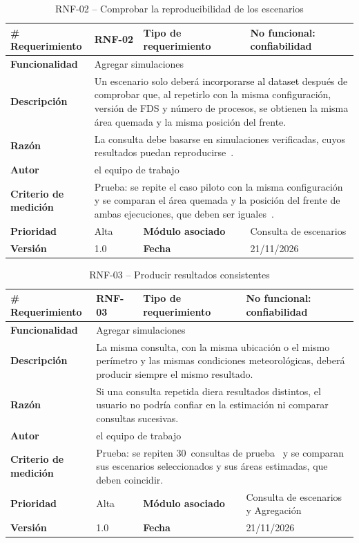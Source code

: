 \begin{longtable}{|p{\rqA}|p{\rqB}|p{\rqC}|p{\rqD}|}
  \caption{RNF-02 -- Comprobar la reproducibilidad de los escenarios}\label{tab:rnf-02}\tabularnewline
  \hline
  \textbf{\# Requerimiento} & RNF-02 & \raggedright\textbf{Tipo de requerimiento} & No funcional: confiabilidad\tabularnewline\hline
  \raggedright\textbf{Funcionalidad} & \multicolumn{3}{p{\rqBCD}|}{Agregar simulaciones}\tabularnewline\hline
  \endfirsthead
  \textbf{Descripción} & \multicolumn{3}{p{\rqBCD}|}{Un escenario solo deberá \textcolor{black}{incorporarse al dataset} después de comprobar que, al repetirlo con la misma configuración, versión de FDS y número de procesos, se obtienen la misma área quemada y la misma posición del frente.}\tabularnewline\hline
  \textbf{Razón} & \multicolumn{3}{p{\rqBCD}|}{La consulta debe basarse en simulaciones verificadas, cuyos resultados puedan reproducirse~\cite{pmp2026}.}\tabularnewline\hline
  \textbf{Autor} & \multicolumn{3}{p{\rqBCD}|}{el equipo de trabajo}\tabularnewline\hline
  \raggedright\textbf{Criterio de medición} & \multicolumn{3}{p{\rqBCD}|}{Prueba: se repite el caso piloto con la misma configuración y se comparan el área quemada y la posición del frente de ambas ejecuciones, que deben ser iguales~\cite{pmp2026}.}\tabularnewline\hline
  \textbf{Prioridad} & Alta & \raggedright\textbf{Módulo asociado} & Consulta de escenarios\tabularnewline\hline
  \textbf{Versión} & 1.0 & \textbf{Fecha} & 21/11/2026\tabularnewline\hline
\end{longtable}

\begin{longtable}{|p{\rqA}|p{\rqB}|p{\rqC}|p{\rqD}|}
  \caption{RNF-03 -- Producir resultados consistentes}\label{tab:rnf-03}\tabularnewline
  \hline
  \textbf{\# Requerimiento} & RNF-03 & \raggedright\textbf{Tipo de requerimiento} & No funcional: confiabilidad\tabularnewline\hline
  \raggedright\textbf{Funcionalidad} & \multicolumn{3}{p{\rqBCD}|}{Agregar simulaciones}\tabularnewline\hline
  \endfirsthead
  \textbf{Descripción} & \multicolumn{3}{p{\rqBCD}|}{La misma consulta, con la misma ubicación o el mismo perímetro y las mismas condiciones meteorológicas, deberá producir siempre el mismo resultado.}\tabularnewline\hline
  \textbf{Razón} & \multicolumn{3}{p{\rqBCD}|}{Si una consulta repetida diera resultados distintos, el usuario no podría confiar en la estimación ni comparar consultas sucesivas.}\tabularnewline\hline
  \textbf{Autor} & \multicolumn{3}{p{\rqBCD}|}{el equipo de trabajo}\tabularnewline\hline
  \raggedright\textbf{Criterio de medición} & \multicolumn{3}{p{\rqBCD}|}{Prueba: se repiten 30~consultas de prueba~\cite{vitoriano2021probabilidad} y se comparan sus escenarios seleccionados y sus áreas estimadas, que deben coincidir.}\tabularnewline\hline
  \textbf{Prioridad} & Alta & \raggedright\textbf{Módulo asociado} & Consulta de escenarios y Agregación\tabularnewline\hline
  \textbf{Versión} & 1.0 & \textbf{Fecha} & 21/11/2026\tabularnewline\hline
\end{longtable}

